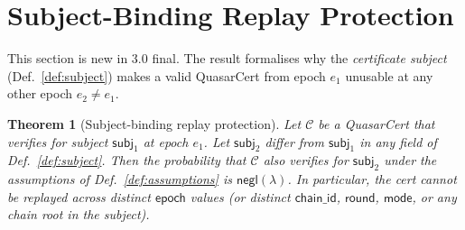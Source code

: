 \documentclass[11pt]{article}
\newtheorem{theorem}{Theorem}
\begin{document}
\section{Subject-Binding Replay Protection}
\label{sec:replay}

This section is new in 3.0 final.  The result formalises why the
\emph{certificate subject} (Def.~\ref{def:subject}) makes a valid
QuasarCert from epoch $e_1$ unusable at any other epoch
$e_2 \neq e_1$.

\begin{theorem}[Subject-binding replay protection]
\label{thm:replay}
Let $\mathcal{C}$ be a QuasarCert that verifies for subject
$\mathsf{subj}_1$ at epoch $e_1$.  Let $\mathsf{subj}_2$ differ from
$\mathsf{subj}_1$ in any field of Def.~\ref{def:subject}.  Then the
probability that $\mathcal{C}$ also verifies for $\mathsf{subj}_2$
under the assumptions of Def.~\ref{def:assumptions} is
$\mathsf{negl}(\lambda)$.  In particular, the cert cannot be replayed
across distinct $\mathsf{epoch}$ values (or distinct
$\mathsf{chain\_id}$, $\mathsf{round}$, $\mathsf{mode}$, or any chain
root in the subject).
\end{theorem}
\end{document}
